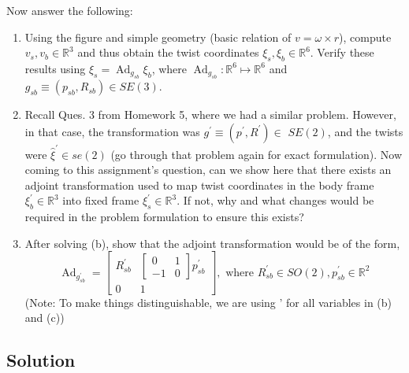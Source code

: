 Now answer the following:
\begin{enumerate}[label= (\alph*)]
    \item Using the figure and simple geometry (basic relation of \( v=\omega \times r \)), compute \( v_{s}, v_{b} \in \mathbb{R}^{3} \) and thus obtain the twist coordinates \( \xi_{s}, \xi_{b} \in \mathbb{R}^{6} \).
          Verify these results using \( \xi_{s}=\operatorname{Ad}_{g_{s b}} \xi_{b} \), where \( \operatorname{Ad}_{g_{s b}}: \mathbb{R}^{6} \mapsto \mathbb{R}^{6} \) and \( g_{s b} \equiv\left(p_{s b}, R_{s b}\right) \in S E(3) \).
    \item Recall Ques. 3 from Homework 5, where we had a similar problem.
          However, in that case, the transformation was \( g^{\prime} \equiv\left(p^{\prime}, R^{\prime}\right) \in \) \( S E(2) \), and the twists were \( \widehat{\xi}^{\prime} \in s e(2) \) (go through that problem again for exact formulation).
          Now coming to this assignment's question, can we show here that there exists an adjoint transformation used to map twist coordinates in the body frame \( \xi_{b}^{\prime} \in \mathbb{R}^{3} \) into fixed frame \( \xi_{s}^{\prime} \in \mathbb{R}^{3} \).
          If not, why and what changes would be required in the problem formulation to ensure this exists?
    \item After solving (b), show that the adjoint transformation would be of the form,
          \[
              \operatorname{Ad}_{g_{s b}^{\prime}}=\left[\begin{array}{cc}
                      R_{s b}^{\prime} & {\left[\begin{array}{cc}
                                                                0  & 1 \\
                                                                -1 & 0
                                                            \end{array}\right] p_{s b}^{\prime}} \\
                      0                & 1
                  \end{array}\right], \text { where } R_{s b}^{\prime} \in S O(2), p_{s b}^{\prime} \in \mathbb{R}^{2}
          \]
          (Note: To make things distinguishable, we are using ' for all variables in (b) and (c))
\end{enumerate}

\clearpage
\subsection*{Solution}
